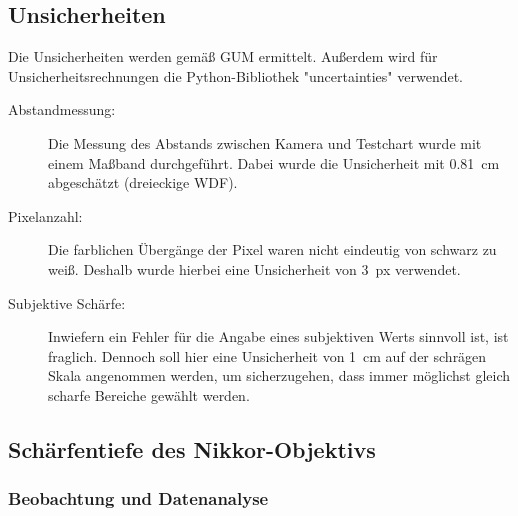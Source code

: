 \documentclass[
	a4paper,
	12pt,
	pagesize,
	ngerman
]{scrartcl}
\begin{document}
	\subsection{Unsicherheiten} %
Die Unsicherheiten werden gemäß GUM ermittelt. 
	Außerdem wird für Unsicherheitsrechnungen die Python-Bibliothek "uncertainties" verwendet.
	\begin{description}
		\item[Abstandmessung:] Die Messung des Abstands zwischen Kamera und Testchart wurde mit einem Maßband durchgeführt. 
			Dabei wurde die Unsicherheit mit \SI{0,81}{cm} abgeschätzt (dreieckige WDF).
		\item[Pixelanzahl:] Die farblichen Übergänge der Pixel waren nicht eindeutig von schwarz zu weiß. 
			Deshalb wurde hierbei eine Unsicherheit von \SI{3}{px} verwendet.  %
		\item[Subjektive Schärfe:] Inwiefern ein Fehler für die Angabe eines subjektiven Werts sinnvoll ist, ist fraglich. 
			Dennoch soll hier eine Unsicherheit von \SI{1}{cm} auf der schrägen Skala angenommen werden, um sicherzugehen, dass immer möglichst gleich scharfe Bereiche gewählt werden.  %
	\end{description} %

	\subsection{Schärfentiefe des Nikkor-Objektivs}
	\subsubsection{Beobachtung und Datenanalyse}
\end{document}
